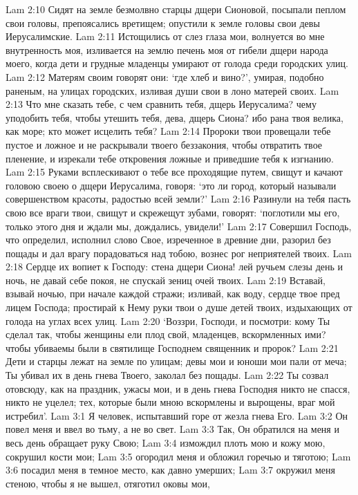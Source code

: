 Lam 2:10  Сидят на земле безмолвно старцы дщери Сионовой, посыпали пеплом свои головы, препоясались вретищем; опустили к земле головы свои девы Иерусалимские.
Lam 2:11  Истощились от слез глаза мои, волнуется во мне внутренность моя, изливается на землю печень моя от гибели дщери народа моего, когда дети и грудные младенцы умирают от голода среди городских улиц.
Lam 2:12  Матерям своим говорят они: `где хлеб и вино?', умирая, подобно раненым, на улицах городских, изливая души свои в лоно матерей своих.
Lam 2:13  Что мне сказать тебе, с чем сравнить тебя, дщерь Иерусалима? чему уподобить тебя, чтобы утешить тебя, дева, дщерь Сиона? ибо рана твоя велика, как море; кто может исцелить тебя?
Lam 2:14  Пророки твои провещали тебе пустое и ложное и не раскрывали твоего беззакония, чтобы отвратить твое пленение, и изрекали тебе откровения ложные и приведшие тебя к изгнанию.
Lam 2:15  Руками всплескивают о тебе все проходящие путем, свищут и качают головою своею о дщери Иерусалима, говоря: `это ли город, который называли совершенством красоты, радостью всей земли?'
Lam 2:16  Разинули на тебя пасть свою все враги твои, свищут и скрежещут зубами, говорят: `поглотили мы его, только этого дня и ждали мы, дождались, увидели!'
Lam 2:17  Совершил Господь, что определил, исполнил слово Свое, изреченное в древние дни, разорил без пощады и дал врагу порадоваться над тобою, вознес рог неприятелей твоих.
Lam 2:18  Сердце их вопиет к Господу: стена дщери Сиона! лей ручьем слезы день и ночь, не давай себе покоя, не спускай зениц очей твоих.
Lam 2:19  Вставай, взывай ночью, при начале каждой стражи; изливай, как воду, сердце твое пред лицем Господа; простирай к Нему руки твои о душе детей твоих, издыхающих от голода на углах всех улиц.
Lam 2:20  `Воззри, Господи, и посмотри: кому Ты сделал так, чтобы женщины ели плод свой, младенцев, вскормленных ими? чтобы убиваемы были в святилище Господнем священник и пророк?
Lam 2:21  Дети и старцы лежат на земле по улицам; девы мои и юноши мои пали от меча; Ты убивал их в день гнева Твоего, заколал без пощады.
Lam 2:22  Ты созвал отовсюду, как на праздник, ужасы мои, и в день гнева Господня никто не спасся, никто не уцелел; тех, которые были мною вскормлены и вырощены, враг мой истребил'.
Lam 3:1  Я человек, испытавший горе от жезла гнева Его.
Lam 3:2  Он повел меня и ввел во тьму, а не во свет.
Lam 3:3  Так, Он обратился на меня и весь день обращает руку Свою;
Lam 3:4  измождил плоть мою и кожу мою, сокрушил кости мои;
Lam 3:5  огородил меня и обложил горечью и тяготою;
Lam 3:6  посадил меня в темное место, как давно умерших;
Lam 3:7  окружил меня стеною, чтобы я не вышел, отяготил оковы мои,

